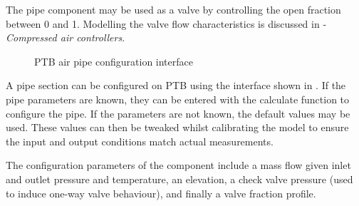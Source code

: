 		The pipe component may be used as a valve by controlling the open fraction between 0 and 1. Modelling the valve flow characteristics is discussed in  - \textit{Compressed air controllers}.
		\begin{figure}[h!]
			\centering
			\caption{PTB air pipe configuration interface}
			\label{fig: PipeInput}
		\end{figure}
		\par
		A pipe section can be configured on PTB using the interface shown in . If the pipe parameters are known, they can be entered with the calculate function to configure the pipe. If the parameters are not known, the default values may be used. These values can then be tweaked whilst calibrating the model to ensure the input and output conditions match actual measurements.
		\par
		The configuration parameters of the component include a mass flow given inlet and outlet pressure and temperature, an elevation, a check valve pressure (used to induce one-way valve behaviour), and finally a valve fraction profile. 
		
